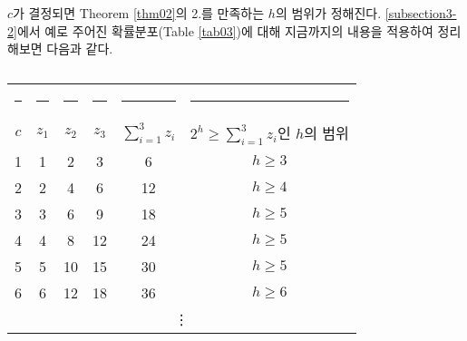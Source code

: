 \documentclass[11pt]{article}
\begin{document}
$c$가 결정되면 Theorem \ref{thm02}의 2.를 만족하는 $h$의 범위가 정해진다. \ref{subsection3-2}에서 예로 주어진 확률분포(Table \ref{tab03})에 대해 지금까지의 내용을 적용하여 정리해보면 다음과 같다.
\\
\begin{table}[h]
\centering
\begin{tabular}{cccccc}
\toprule
\rule{1cm}{0pt} & \rule{0.6cm}{0pt} & \rule{0.6cm}{0pt} & \rule{0.6cm}{0pt} & \rule{1.2cm}{0pt} & \rule{3cm}{0pt} \\[-\arraystretch\normalbaselineskip]
$c$ & $z_{1}$ & $z_{2}$ & $z_{3}$ & $\displaystyle \sum_{i=1}^{3}z_{i}$ & $2^{h} \ge \displaystyle \sum_{i=1}^{3}z_{i}$인 $h$의 범위 \\
\midrule
1 & 1 & 2 & 3 & 6 & $h \ge 3$\\
2 & 2 & 4 & 6 & 12 & $h \ge 4$\\
3 & 3 & 6 & 9 & 18 & $h \ge 5$\\
4 & 4 & 8 & 12 & 24 & $h \ge 5$\\
5 & 5 & 10 & 15 & 30 & $h \ge 5$\\
6 & 6 & 12 & 18 & 36 & $h \ge 6$\\
\multicolumn{6}{c}{\vdots}\\
\bottomrule
\end{tabular}
\caption{}
\label{tab05}
\end{table}
\end{document}
